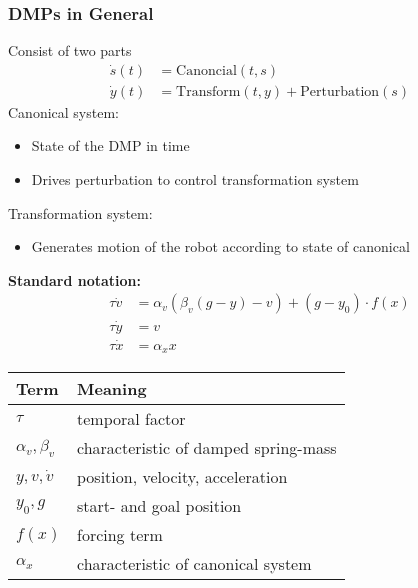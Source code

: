 \subsubsection{DMPs in General}%
\label{ar:ssub:dmps_in_general}
Consist of two parts
\begin{align}
  \dot{s}(t) &= \text{Canoncial}(t, s)\\
  \dot{y}(t) &= \text{Transform}(t, y) + \text{Perturbation}(s)
\end{align}
Canonical system:
\begin{itemize}
\item State of the DMP in time
\item Drives perturbation to control transformation system
\end{itemize}

Transformation system:
\begin{itemize}
\item Generates motion of the robot according to state of canonical
\end{itemize}

\textbf{Standard notation:}
\begin{align*}
  \tau \dot{v} &= \alpha_v (\beta_v ( g - y)  - v) + (g - y_0) \cdot f(x)\\
  \tau \dot{y} &= v\\
  \tau \dot{x} &= \alpha_x x
\end{align*}

\begin{center}
  \begin{tabular}{|l|l|}
    \hline
    Term & Meaning  \\ \hline
    \(\tau\) & temporal factor \\
    \(\alpha_v, \beta_v\) & characteristic of damped spring-mass  \\
    \(y, v, \dot{v}\) & position, velocity, acceleration  \\ 
    \(y_0, g\) & start- and goal position\\
    \(f(x)\) & forcing term\\ 
    \(\alpha_x\) & characteristic of canonical system\\ \hline
  \end{tabular}
\end{center}

